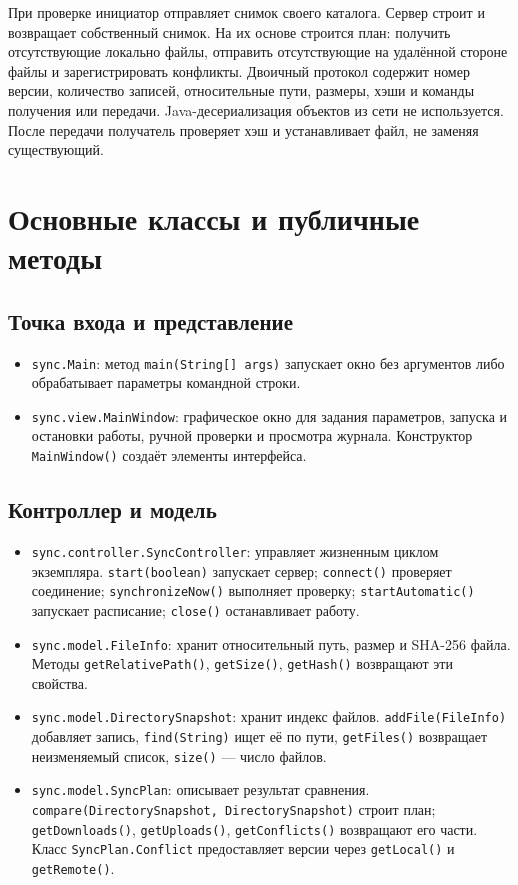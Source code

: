 \documentclass[12pt,a4paper]{article}
\begin{document}
При проверке инициатор отправляет снимок своего каталога. Сервер строит и возвращает собственный снимок. На их основе строится план: получить отсутствующие локально файлы, отправить отсутствующие на удалённой стороне файлы и зарегистрировать конфликты. Двоичный протокол содержит номер версии, количество записей, относительные пути, размеры, хэши и команды получения или передачи. Java-десериализация объектов из сети не используется. После передачи получатель проверяет хэш и устанавливает файл, не заменяя существующий.

\section{Основные классы и публичные методы}
\begingroup
\raggedright
\sloppy

\subsection{Точка входа и представление}
\begin{itemize}
  \item \texttt{sync.Main}: метод \texttt{main(String[] args)} запускает окно без аргументов либо обрабатывает параметры командной строки.
  \item \texttt{sync.view.MainWindow}: графическое окно для задания параметров, запуска и остановки работы, ручной проверки и просмотра журнала. Конструктор \texttt{MainWindow()} создаёт элементы интерфейса.
\end{itemize}

\clearpage
\subsection{Контроллер и модель}
\begin{itemize}
\setlength{\itemsep}{0pt}
  \item \texttt{sync.controller.SyncController}: управляет жизненным циклом экземпляра. \texttt{start(boolean)} запускает сервер; \texttt{connect()} проверяет соединение; \texttt{synchronizeNow()} выполняет проверку; \texttt{startAutomatic()} запускает расписание; \texttt{close()} останавливает работу.
  \item \texttt{sync.model.FileInfo}: хранит относительный путь, размер и SHA-256 файла. Методы \texttt{getRelativePath()}, \texttt{getSize()}, \texttt{getHash()} возвращают эти свойства.
  \item \texttt{sync.model.DirectorySnapshot}: хранит индекс файлов. \texttt{addFile(FileInfo)} добавляет запись, \texttt{find(String)} ищет её по пути, \texttt{getFiles()} возвращает неизменяемый список, \texttt{size()} --- число файлов.
  \item \texttt{sync.model.SyncPlan}: описывает результат сравнения. \texttt{compare(\allowbreak DirectorySnapshot,\allowbreak{} DirectorySnapshot)} строит план; \texttt{getDownloads()}, \texttt{getUploads()}, \texttt{getConflicts()} возвращают его части. Класс \texttt{SyncPlan.Conflict} предоставляет версии через \texttt{getLocal()} и \texttt{getRemote()}.
\end{itemize}
\end{document}
